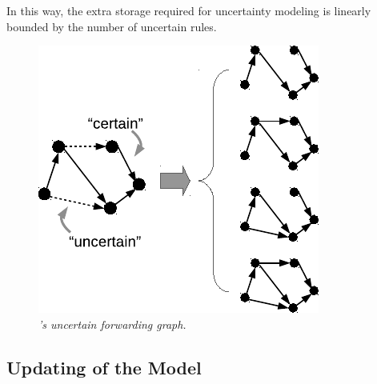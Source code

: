 In this way, the extra storage required for uncertainty modeling is linearly bounded by the number of uncertain rules.


\begin{figure}[!ht]
  \centering
  \vspace{-0.1in}
  \includegraphics[width=0.6\columnwidth]{figs/model2}
  \vspace{-0.15in}
  \caption{\em \small \name's uncertain forwarding graph. 
  }
  \vspace{-0.2in}
  \label{fig:model}
\end{figure}

\subsection{ Updating of the Model}
\label{sec:confirm}

